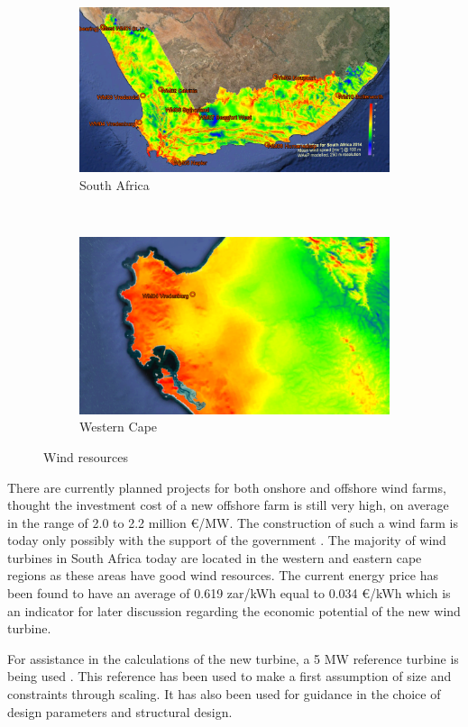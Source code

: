 \begin{figure}[H] 
\centering
\begin{subfigure}{0.45\textwidth}
\includegraphics[width=\linewidth]{Images/Wind_atlas_map.PNG} 
\caption{South Africa}
\label{fig:windsa}
\end{subfigure}~
\begin{subfigure}{0.423\textwidth}
\includegraphics[width=\linewidth]{Images/Wind_atlas_zoomed.PNG}
\caption{Western Cape}
\label{fig:windlocation}
\end{subfigure}
\caption{Wind resources}
\label{fig:windrs}
\end{figure}

There are currently planned projects for both onshore and offshore wind farms, thought the investment cost of a new offshore farm is still very high, on average in the range of 2.0 to 2.2 million €/MW. The construction of such a wind farm is today only possibly with the support of the government \cite{offcost}. The majority of wind turbines in South Africa today are located in the western and eastern cape regions as these areas have good wind resources. The current energy price has been found to have an average of 0.619 zar/kWh equal to 0.034 €/kWh \cite{eprice} which is an indicator for later discussion regarding the economic potential of the new wind turbine.

For assistance in the calculations of the new turbine, a 5 MW reference turbine is being used \cite{5MW}. This reference has been used to make a first assumption of size and constraints through scaling. It has also been used for guidance in the choice of design parameters and structural design.
